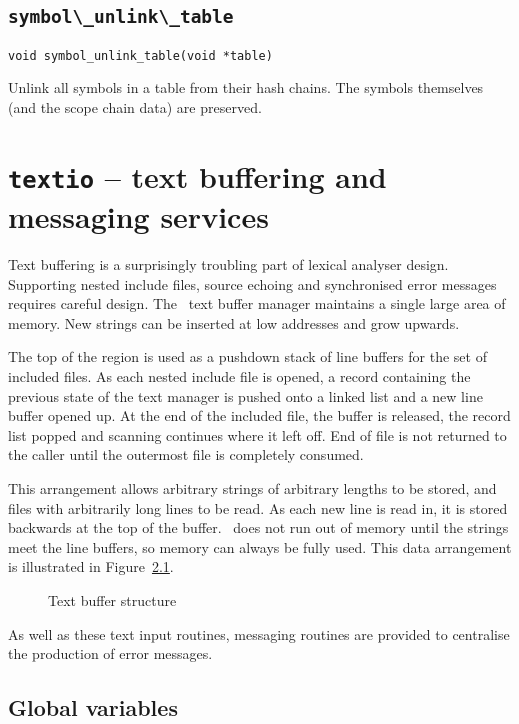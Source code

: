 \section{\protect\verb+symbol\_unlink\_table+}
\begin{verbatim}
void symbol_unlink_table(void *table)
\end{verbatim}
Unlink all symbols in a table from their hash chains. 
The symbols themselves (and the scope chain data) are
preserved. 

\chapter{{\tt textio} -- text buffering and messaging services}
\label{textio}
Text buffering is a surprisingly troubling part of lexical analyser design.
Supporting nested include files, source echoing and synchronised error
messages requires careful design. The \rdp\ text buffer manager
maintains a single large area of memory. New strings can be inserted at
low addresses and grow upwards. 

The top of the region is used as a
pushdown stack of line buffers for the set of included files. As each
nested include file is opened, a record containing the previous state of
the text manager is pushed onto a linked list and a new line buffer
opened up. At the end of the included file, the buffer is released, the
record list popped and scanning continues where it left off. End of file
is not returned to the caller until the outermost file is completely consumed.

This arrangement allows arbitrary strings of arbitrary lengths to be
stored, and files with arbitrarily long lines to be read. As each new
line is read in, it is stored backwards at the top of the buffer. \rdp\
does not run out of memory until the strings meet the line buffers, so
memory can always be fully used.
This data arrangement is illustrated in Figure~\ref{text:structure}.

\begin{figure}
\begin{center}

\end{center}
\caption{Text buffer structure}
\label{text:structure}
\end{figure}

As well as these text input routines, messaging routines are provided to
centralise the production of error messages. 

\section{Global variables}
